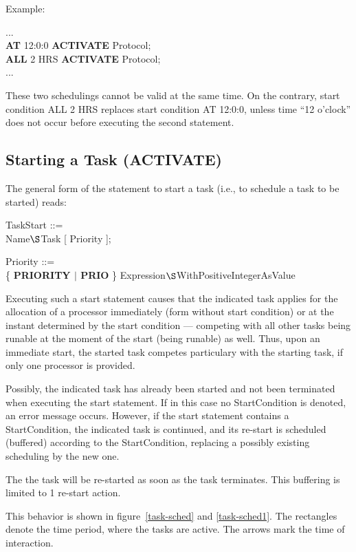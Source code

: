 Example:

...\\
{\bf AT} 12:0:0 {\bf ACTIVATE} Protocol; \\
{\bf ALL} 2 HRS {\bf ACTIVATE} Protocol; \\
...

These two schedulings cannot be valid at the same time. On the contrary,
start condition ALL 2 HRS replaces start condition AT 12:0:0, unless
time ``12 o'clock'' does not occur before executing the second
statement.

\subsection{Starting a Task (ACTIVATE)}   %

The general form of the statement to start a task (i.e., to schedule a
task to be started) reads:

TaskStart ::=\\
 Name$\S $Task [ Priority ];

Priority ::=\\
\x \{ {\bf PRIORITY $\mid$ PRIO} \} Expression$\S $WithPositiveIntegerAsValue

Executing such a start statement causes that the indicated task
applies for the allocation of a processor immediately (form without
start condition) or at the instant determined by the start condition ---
competing with all other tasks being runable at the moment
of the start (being runable) as well. Thus, upon an immediate start,
the started task competes particulary with the starting task, if only
one processor is provided.

Possibly, the indicated task has already been started and not been
terminated when executing the start statement. If in this case no
StartCondition is denoted, an error message occurs.
However, if the
start statement contains a StartCondition, the indicated task is
continued, and its re-start is scheduled (buffered) according to the
StartCondition, replacing a possibly existing scheduling by the new
one.
\begin{added}
The the task will be re-started as soon as the task terminates.
This buffering is limited to 1 re-start action.

This behavior is shown in figure~\ref{task-sched} and \ref{task-sched1}. The rectangles denote the time period, where the tasks are active. The arrows mark
the time of interaction.
\end{added}

